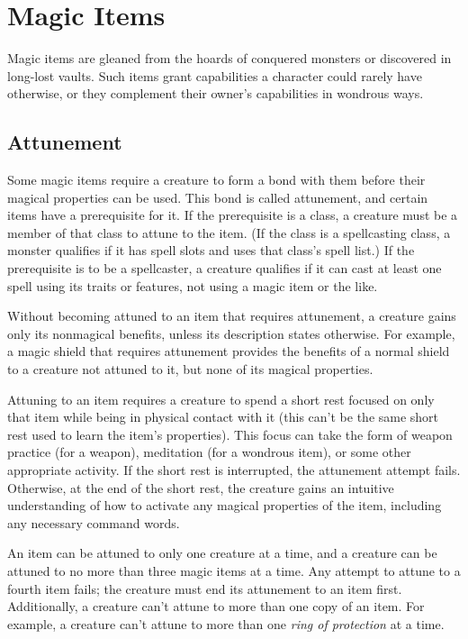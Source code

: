 \documentclass[
]{article}
\date{}
\begin{document}
\hypertarget{magic-items}{%
\section{Magic Items}\label{magic-items}}

Magic items are gleaned from the hoards of conquered monsters or
discovered in long-lost vaults. Such items grant capabilities a
character could rarely have otherwise, or they complement their owner's
capabilities in wondrous ways.

\hypertarget{attunement}{%
\subsection{Attunement}\label{attunement}}

Some magic items require a creature to form a bond with them before
their magical properties can be used. This bond is called attunement,
and certain items have a prerequisite for it. If the prerequisite is a
class, a creature must be a member of that class to attune to the item.
(If the class is a spellcasting class, a monster qualifies if it has
spell slots and uses that class's spell list.) If the prerequisite is to
be a spellcaster, a creature qualifies if it can cast at least one spell
using its traits or features, not using a magic item or the like.

Without becoming attuned to an item that requires attunement, a creature
gains only its nonmagical benefits, unless its description states
otherwise. For example, a magic shield that requires attunement provides
the benefits of a normal shield to a creature not attuned to it, but
none of its magical properties.

Attuning to an item requires a creature to spend a short rest focused on
only that item while being in physical contact with it (this can't be
the same short rest used to learn the item's properties). This focus can
take the form of weapon practice (for a weapon), meditation (for a
wondrous item), or some other appropriate activity. If the short rest is
interrupted, the attunement attempt fails. Otherwise, at the end of the
short rest, the creature gains an intuitive understanding of how to
activate any magical properties of the item, including any necessary
command words.

An item can be attuned to only one creature at a time, and a creature
can be attuned to no more than three magic items at a time. Any attempt
to attune to a fourth item fails; the creature must end its attunement
to an item first. Additionally, a creature can't attune to more than one
copy of an item. For example, a creature can't attune to more than one
\emph{ring of protection} at a time.
\end{document}
